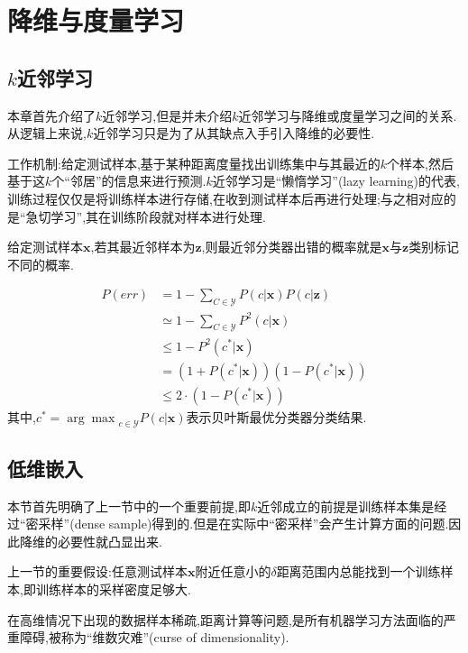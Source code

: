 \chapter{降维与度量学习}

\section{$k$近邻学习}

本章首先介绍了$k$近邻学习,但是并未介绍$k$近邻学习与降维或度量学习之间的关系.从逻辑上来说,$k$近邻学习只是为了从其缺点入手引入降维的必要性.

工作机制:给定测试样本,基于某种距离度量找出训练集中与其最近的$k$个样本,然后基于这$k$个``邻居''的信息来进行预测.$k$近邻学习是``懒惰学习''(lazy learning)的代表,训练过程仅仅是将训练样本进行存储,在收到测试样本后再进行处理;与之相对应的是``急切学习'',其在训练阶段就对样本进行处理.

给定测试样本$\mathbf{x}$,若其最近邻样本为$\mathbf{z}$,则最近邻分类器出错的概率就是$\mathbf{x}$与$\mathbf{z}$类别标记不同的概率.

\begin{equation}\begin{split}
P(err)&=1-\sum_{C\in\mathcal{Y}}P(c|\mathbf{x})P(c|\mathbf{z})\\&\simeq 1-\sum_{C\in\mathcal{Y}}P^2(c|\mathbf{x})\\&\le 1-P^2(c^\ast|\mathbf{x})\\&=(1+P(c^\ast|\mathbf{x}))(1-P(c^\ast|\mathbf{x}))\\&\le 2\cdot(1-P(c^\ast|\mathbf{x}))
\end{split}\end{equation}
其中,$c^\ast={\arg\max}_{c\in\mathcal{Y}}P(c|\mathbf{x})$表示贝叶斯最优分类器分类结果.

\section{低维嵌入}

本节首先明确了上一节中的一个重要前提,即$k$近邻成立的前提是训练样本集是经过``密采样''(dense sample)得到的.但是在实际中``密采样''会产生计算方面的问题.因此降维的必要性就凸显出来.

上一节的重要假设:任意测试样本$\mathbf{x}$附近任意小的$\delta$距离范围内总能找到一个训练样本,即训练样本的采样密度足够大.

在高维情况下出现的数据样本稀疏,距离计算等问题,是所有机器学习方法面临的严重障碍,被称为``维数灾难''(curse of dimensionality).

